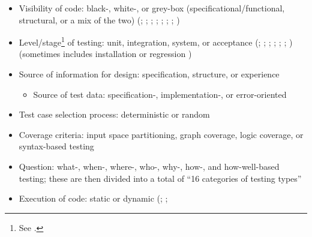 \begin{itemize}
      \item Visibility of code: black-, white-, or grey-box
            (specificational/functional, structural, or a mix of the two)
            (\citealp[p.~8]{IEEE2021}; \citealp[pp.~5-10,~5-16]{SWEBOK2024};
            \citealp[p.~601, called ``testing approaches'' and (stepwise) code
                  reading replaced ``grey-box testing'']{SharmaEtAl2021};
            \citealp[pp.~57-58]{AmmannAndOffutt2017};
            \citealp[p.~213]{KuļešovsEtAl2013};
            \citealp[pp.~53,~218]{Patton2006}; \citealp[p.~69]{Perry2006};
            \citealp[pp.~4-5, called ``testing methods'']{Kam2008})
      \item Level/stage\footnote{See .} of testing:
            unit, integration, system, or acceptance
            (\citealp[pp.~5-6 to 5-7]{SWEBOK2024}; \citealpISTQB{};
            \citealp[p.~218]{KuļešovsEtAl2013} ;
            \citealp{Patton2006}; \citealp{Perry2006};
            \citealp{PetersAndPedrycz2000}; \citealp[pp.~9,~13]{Gerrard2000a})
            (sometimes includes installation \citep[p.~439]{vanVliet2000} or
            regression \citep[p.~3]{BarbosaEtAl2006})
      \item Source of information for design: specification, structure, or
            experience \citep[p.~8]{IEEE2021}
            \begin{itemize}
                  \item Source of test data: specification-, implementation-,
                        or error-oriented \citep[p.~440]{PetersAndPedrycz2000}
            \end{itemize}
      \item Test case selection process: deterministic or random
            \citep[p.~5-16]{SWEBOK2024}
      \item Coverage criteria: input space partitioning, graph coverage, logic
            coverage, or syntax-based testing \citep[pp.~18-19]{AmmannAndOffutt2017}
      \item Question: what-, when-, where-, who-, why-, how-, and how-well-based
            testing; these are then divided into a total of ``16 categories of
            testing types''
            \citep[p.~17]{Firesmith2015}
      \item Execution of code: static or dynamic
            (\citealp[p.~214]{KuļešovsEtAl2013}; \citealp[p.~12]{Gerrard2000a};

\end{itemize}
